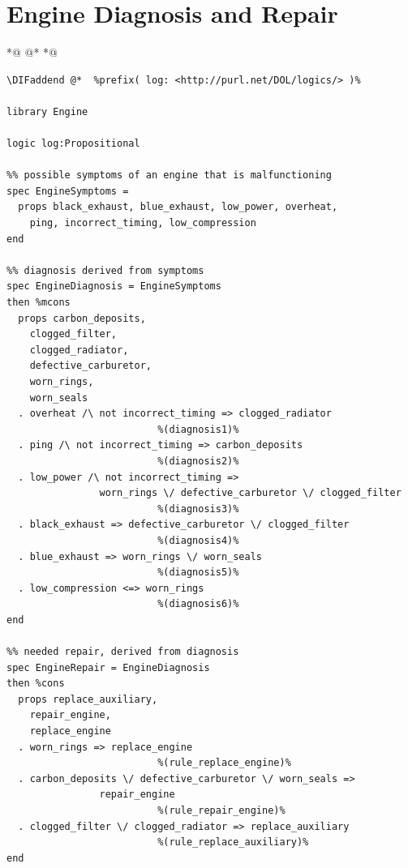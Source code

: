 \documentclass[10pt,fleqn,final]{scrreprt}
\newcommand{\sclause}[1]{\section{#1}}
\providecommand{\DIFaddbegin}{} %
\providecommand{\DIFaddend}{} %
\providecommand{\DIFdelbegin}{} %
\providecommand{\DIFdelend}{} %
\begin{document}
\sclause{Engine Diagnosis and Repair}\DIFdelbegin %
\DIFdelend \DIFaddbegin \label{ex:engine}
\DIFaddend 

 *@ \DIFdelbegin %
\DIFdelend @*   *@ \DIFaddbegin \begin{lstlisting}[basicstyle=\ttfamily,language=dolText,alsolanguage=prop,escapechar=@,mathescape]
\DIFaddend @*  %prefix( log: <http://purl.net/DOL/logics/> )%

library Engine

logic log:Propositional

%% possible symptoms of an engine that is malfunctioning
spec EngineSymptoms =
  props black_exhaust, blue_exhaust, low_power, overheat,
	ping, incorrect_timing,	low_compression
end

%% diagnosis derived from symptoms
spec EngineDiagnosis = EngineSymptoms
then %mcons
  props carbon_deposits,
	clogged_filter,
	clogged_radiator,
	defective_carburetor,
	worn_rings,
	worn_seals
  . overheat /\ not incorrect_timing => clogged_radiator
                          %(diagnosis1)%
  . ping /\ not incorrect_timing => carbon_deposits
                          %(diagnosis2)%
  . low_power /\ not incorrect_timing =>
                worn_rings \/ defective_carburetor \/ clogged_filter
                          %(diagnosis3)%
  . black_exhaust => defective_carburetor \/ clogged_filter
                          %(diagnosis4)%
  . blue_exhaust => worn_rings \/ worn_seals
                          %(diagnosis5)%
  . low_compression <=> worn_rings
                          %(diagnosis6)%
end

%% needed repair, derived from diagnosis
spec EngineRepair = EngineDiagnosis
then %cons
  props replace_auxiliary,
	repair_engine,
	replace_engine
  . worn_rings => replace_engine
                          %(rule_replace_engine)%
  . carbon_deposits \/ defective_carburetor \/ worn_seals =>
                repair_engine
                          %(rule_repair_engine)%
  . clogged_filter \/ clogged_radiator => replace_auxiliary
                          %(rule_replace_auxiliary)%
end


\end{lstlisting}
\end{document}
